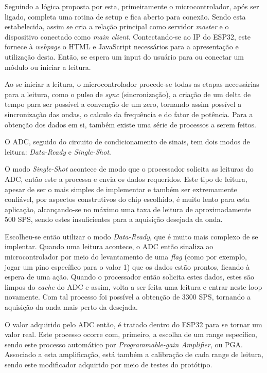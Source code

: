 Seguindo a lógica proposta por esta, primeiramente o microcontrolador, após ser ligado, completa uma rotina de setup e fica aberto para conexão. Sendo esta estabelecida, assim se cria a relação principal como servidor \textit{master} e o dispositivo conectado como \textit{main client}. Contectando-se ao IP do ESP32, este fornece à \textit{webpage} o HTML e JavaScript necessários para a apresentação e utilização desta. Então, se espera um input do usuário para ou conectar um módulo ou iniciar a leitura.

Ao se iniciar a leitura, o microcontrolador procede-se todas as etapas necessárias para a leitura, como o pulso de \textit{sync} (sincronização), a criação de um delta de tempo para ser possível a convenção de um zero, tornando assim possível a sincronização das ondas, o calculo da frequência e do fator de potência. Para a obtenção dos dados em si, também existe uma série de processos a serem feitos.

O \gls{ADC}, seguido do circuito de condicionamento de sinais, tem dois modos de leitura: \textit{Data-Ready} e \textit{Single-Shot}.

O modo \textit{Single-Shot} acontece de modo que o processador solicita as leituras do \gls{ADC}, então este a processa e envia os dados requeridos. Este tipo de leitura, apesar de ser o mais simples de implementar e também ser extremamente confiável, por aspectos construtivos do chip escolhido, é muito lento para esta aplicação, alcançando-se no máximo uma taxa de leitura de aproximadamente 500 \gls{SPS}, sendo estes insuficientes para a aquisição desejada da onda.

Escolheu-se então utilizar o modo \textit{Data-Ready}, que é muito mais complexo de se implentar. Quando uma leitura acontece, o \gls{ADC} então sinaliza ao microcontrolador por meio do levantamento de uma \textit{flag} (como por exemplo, jogar um pino específico para o valor 1) que os dados estão prontos, ficando à espera de uma ação. Quando o processador então solicita estes dados, estes são limpos do \textit{cache} do \gls{ADC} e assim, volta a ser feita uma leitura e entrar neste loop novamente. Com tal processo foi possível a obtenção de 3300 \gls{SPS}, tornando a aquisição da onda mais perto da desejada.

O valor adquirido pelo ADC então, é tratado dentro do ESP32 para se tornar um valor real. Este processo ocorre com, primeiro, a escolha de um range específico, sendo este processo automático por \textit{Programmable-gain Amplifier}, ou \gls{PGA}. Associado a esta amplificação, está também a calibração de cada range de leitura, sendo este modificador adquirido por meio de testes do protótipo.

